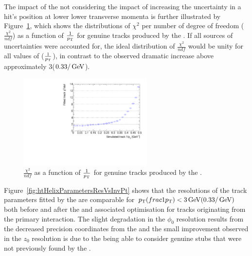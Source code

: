 The impact of the \KF not considering the impact of \MS increasing the uncertainty in a hit's position at lower lower transverse momenta is further illustrated by Figure~\ref{fig:2GeVFlatChi2Ndf}, which shows the distributions of $\chi^{2}$ per number of degree of freedom ($\frac{\chi^{2}}{ndf}$) as a function of $\frac{1}{p_{\mathrm{T}}}$ for genuine tracks produced by the \KF.
If all sources of uncertainties were accounted for, the ideal distribution of $\frac{\chi^{2}}{ndf}$ would be unity for all values of \pT ($\frac{1}{p_{\mathrm{T}}}$), in contrast to the observed dramatic increase above approximately 3\GeV ($0.33/\,\text{Ge\hspace{-.08em}V}$).

\begin{figure}[htb]
\centering
\includegraphics[width=0.60\textwidth]{figs/tk-upgrade/results-lowPtTracking/kfChi2NdfVsInvPtFlatGeometry_5000.pdf}
\caption{$\frac{\chi^{2}}{ndf}$ as a function of $\frac{1}{p_{\mathrm{T}}}$ for genuine tracks produced by the \KF.}
\label{fig:2GeVFlatChi2Ndf}
\end{figure}

Figure~\ref{fig:htHelixParametersResVsInvPt} shows that the resolutions of the track parameters fitted by the \KF are comparable for $p_{\mathrm{T}} (frac{1}{p_{\mathrm{T}}})  < 3\,\text{Ge\hspace{-.08em}V} (0.33/\,\text{Ge\hspace{-.08em}V})$ both before and after the \HT and associated \KF optimisation for tracks originating from the primary interaction.
The slight degradation in the $\phi_{0}$ resolution results from the decreased precision coordinates from the \HT and the small improvement observed in the $z_{0}$ resolution is due to the \KF being able to consider genuine stubs that were not previously found by the \HT.

